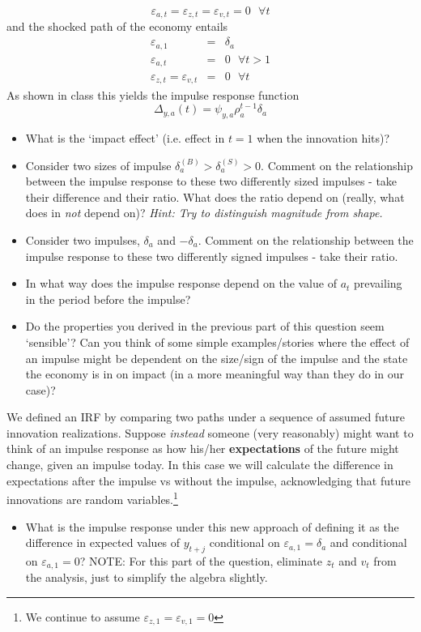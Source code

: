 \documentclass[authoryear,11pt]{elsarticle}
\begin{document}
\[
\varepsilon_{a,t}=\varepsilon_{z,t}=\varepsilon_{v,t}=0 \text{  }\forall t
\]
and the shocked path of the economy entails
\begin{eqnarray*}
\varepsilon_{a,1} &=& \delta_{a} \\
\varepsilon_{a,t} &=& 0 \text{  }\forall t>1 \\
\varepsilon_{z,t}=\varepsilon_{v,t}&=&0 \text{  }\forall t
\end{eqnarray*}
As shown in class this yields the impulse response function
\[
\Delta_{y,a}(t) = \psi_{y,a} \rho_a^{t-1} \delta_{a}
\]

\begin{itemize}
\item	What is the `impact effect' (i.e. effect in $t=1$ when the innovation hits)?
\item	Consider two sizes of impulse $\delta_{a}^{(B)} > \delta_{a}^{(S)} > 0$. Comment on the relationship between the impulse response to these two differently sized impulses - take their difference and their ratio. What does the ratio depend on (really, what does in \emph{not} depend on)? \emph{Hint: Try to distinguish magnitude from shape.}
\item	Consider two impulses, $\delta_{a}$ and $-\delta_{a}$. Comment on the relationship between the impulse response to these two differently signed impulses - take their ratio.
\item	In what way does the impulse response depend on the value of $a_{t}$ prevailing in the period before the impulse?
\item	Do the properties you derived in the previous part of this question seem `sensible'? Can you think of some simple examples/stories where the effect of an impulse might be dependent on the size/sign of the impulse and the state the economy is in on impact (in a more meaningful way than they do in our case)?
\end{itemize}

We defined an IRF by comparing two paths under a sequence of assumed future innovation realizations. Suppose \emph{instead} someone (very reasonably) might want to think of an impulse response as how his/her \textbf{expectations} of the future might change, given an impulse today. In this case we will calculate the difference in expectations after the impulse vs without the impulse, acknowledging that future innovations are random variables.\footnote{We continue to assume $\varepsilon_{z,1}=\varepsilon_{v,1}=0$}
\begin{itemize}
\item	What is the impulse response under this new approach of defining it as the difference in expected values of $y_{t+j}$ conditional on $\varepsilon_{a,1}=\delta_{a}$ and conditional on $\varepsilon_{a,1}=0$? NOTE: For this part of the question, eliminate $z_{t}$ and $v_{t}$ from the analysis, just to simplify the algebra slightly.
\end{itemize}
\end{document}
